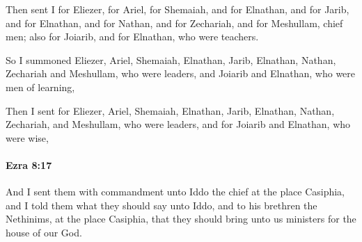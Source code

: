 			\begin{versebox}
					\item[BHS] 
					\item[LXX] 
					\item[ASV] Then sent I for Eliezer, for Ariel, for Shemaiah, and for Elnathan, and for Jarib, and for Elnathan, and for Nathan, and for Zechariah, and for Meshullam, chief men; also for Joiarib, and for Elnathan, who were teachers.
					\item[NIV] So I summoned Eliezer, Ariel, Shemaiah, Elnathan, Jarib, Elnathan, Nathan, Zechariah and Meshullam, who were leaders, and Joiarib and Elnathan, who were men of learning,
					\item[NRSV] Then I sent for Eliezer, Ariel, Shemaiah, Elnathan, Jarib, Elnathan, Nathan, Zechariah, and Meshullam, who were leaders, and for Joiarib and Elnathan, who were wise,
			\end{versebox}

		\paragraph{Ezra 8:17} %
			\label{EZRA-8-17}

			And I sent them with commandment unto Iddo the chief at the place Casiphia, and I told them what they should say unto Iddo, and to his brethren the Nethinims, at the place Casiphia, that they should bring unto us ministers for the house of our God.

